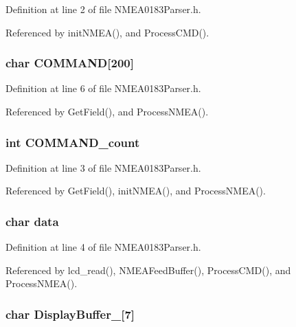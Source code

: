 Definition at line 2 of file NMEA0183Parser.h.

Referenced by initNMEA(), and ProcessCMD().
\subsubsection{\setlength{\rightskip}{0pt plus 5cm}char {\bf COMMAND}[200]}\label{_n_m_e_a0183_parser_8h_6268ac84e8681db2593fdeb0552ff4e6}




Definition at line 6 of file NMEA0183Parser.h.

Referenced by GetField(), and ProcessNMEA().
\subsubsection{\setlength{\rightskip}{0pt plus 5cm}int {\bf COMMAND\_\-count}}\label{_n_m_e_a0183_parser_8h_3b1e5a0b8d85055713d0d73eea899a31}




Definition at line 3 of file NMEA0183Parser.h.

Referenced by GetField(), initNMEA(), and ProcessNMEA().
\subsubsection{\setlength{\rightskip}{0pt plus 5cm}char {\bf data}}\label{_n_m_e_a0183_parser_8h_0f11fc08c1ec2c8146ddd0d5b8fe8355}




Definition at line 4 of file NMEA0183Parser.h.

Referenced by lcd\_\-read(), NMEAFeedBuffer(), ProcessCMD(), and ProcessNMEA().
\subsubsection{\setlength{\rightskip}{0pt plus 5cm}char {\bf DisplayBuffer\_}[7]}\label{_n_m_e_a0183_parser_8h_89ec3f18b992117368d2008857a4b7e0}




